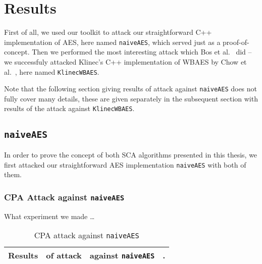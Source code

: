 \section{Results}
\label{sec:results}

First of all, we used our toolkit to attack our straightforward C++ implementation of AES, here named {\tt naiveAES}, which served just as a proof-of-concept. Then we performed the most interesting attack which Bos et al.\ \cite{bos2015differential} did -- we successfuly attacked Klinec's C++ implementation \cite{klinec2013implementation} of WBAES by Chow et al.\ \cite{chow2002aes}, here named {\tt KlinecWBAES}.

Note that the following section giving results of attack against {\tt naiveAES} does not fully cover many details, these are given separately in the subsequent section with results of the attack against {\tt KlinecWBAES}.



\subsection{\tt naiveAES}
\label{sec:naiveaes}

In order to prove the concept of both SCA algorithms presented in this thesis, we first attacked our straightforward AES implementation {\tt naiveAES} with both of them.

\subsubsection{CPA Attack against {\tt naiveAES}}
	
	What experiment we made \ldots
	
	\begin{table}[H]
		\begin{center}
		\begin{tabular}{| c | c | c | c |}
			\hline
			Results & of attack & against {\tt naiveAES} & . \\
			\hline
		\end{tabular}
		\end{center}
	\caption{CPA attack against {\tt naiveAES}}
	\label{tab:naiveaescpa}
	\end{table}
	

